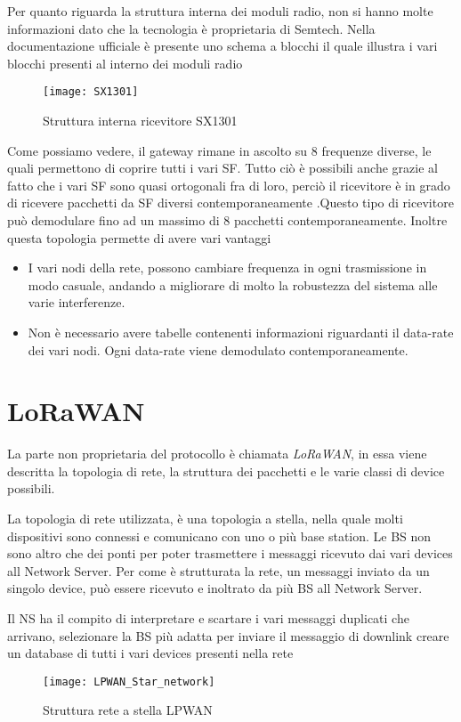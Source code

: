 Per quanto riguarda la struttura interna dei moduli radio, non si hanno molte
informazioni dato che la tecnologia è proprietaria di Semtech. Nella
documentazione ufficiale è presente uno schema a blocchi il quale illustra i
vari blocchi presenti al interno dei moduli radio
\begin{figure}[h]
\centering 
\texttt{[image: SX1301]}
\caption{Struttura interna ricevitore SX1301}
\end{figure}
Come possiamo vedere, il gateway rimane in ascolto su 8 frequenze diverse, le
quali permettono di coprire tutti i vari SF. Tutto ciò è possibili anche grazie
al fatto che i vari SF sono quasi ortogonali fra di loro, perciò il ricevitore è
in grado di ricevere pacchetti da SF diversi contemporaneamente .Questo tipo di ricevitore può
demodulare fino ad un massimo di 8 pacchetti contemporaneamente. Inoltre questa
topologia permette di avere vari vantaggi
\begin{itemize}
\item I vari nodi della rete, possono cambiare frequenza in ogni trasmissione in
modo casuale, andando a migliorare di molto la robustezza del sistema alle varie
interferenze.
\item Non è necessario avere tabelle contenenti informazioni riguardanti il
data-rate dei vari nodi. Ogni data-rate viene demodulato contemporaneamente.
\end{itemize}
\section{LoRaWAN}
La parte non proprietaria del protocollo è chiamata \emph{LoRaWAN}, in essa
viene descritta la topologia di rete, la struttura dei pacchetti e le varie
classi di device possibili.

La topologia di rete utilizzata, è una topologia a stella, nella quale molti
dispositivi sono connessi e comunicano con uno o più base station. Le BS non
sono altro che dei ponti per poter trasmettere i messaggi ricevuto dai vari
devices all Network Server. Per come è strutturata la rete, un messaggi inviato
da un singolo device, può essere ricevuto e inoltrato da più BS all Network
Server.

Il NS ha il compito di interpretare e scartare i vari messaggi duplicati che
arrivano, selezionare la BS più adatta per inviare il messaggio di downlink 
creare un database di tutti i vari devices presenti nella rete 

\begin{figure}[h]
\centering 
\texttt{[image: LPWAN\_Star\_network]}
\caption{Struttura rete a stella LPWAN}
\end{figure}

